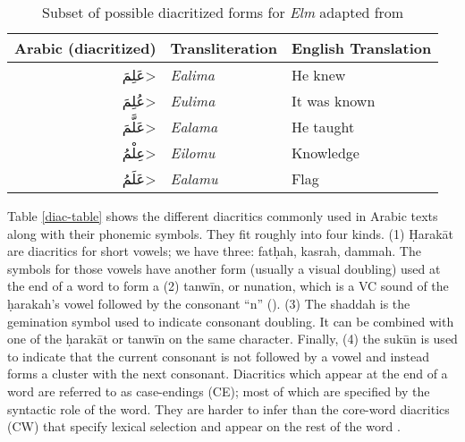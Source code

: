 \documentclass[11pt]{article}
\begin{document}
\begin{table}[ht]
\centering
\begin{tabular}{|r|l|l|}
\hline 
\bf Arabic (diacritized) & \bf Transliteration & \bf English Translation \\ \hline
\<عَلِمَ>   &   \textit{Ealima}          & He knew \\
\<عُلِمَ>   &   \textit{Eulima}          & It was known \\
\<عَلَّمَ>   &   \textit{Ealama}    & He taught \\
\<عِلْمُ>   &   \textit{Eilomu}          & Knowledge \\
\<عَلَمُ>   &   \textit{Ealamu}          & Flag \\
\hline
\end{tabular}
\caption{Subset of possible diacritized forms for \textit{Elm} adapted from \protect\cite{belinkov-glass-2015-arabic} }
\label{elm-table}
\end{table}

Table \ref{diac-table} shows the different diacritics commonly used in Arabic texts along with their phonemic symbols. They fit roughly into four kinds. (1) \d{H}arakāt are diacritics for short vowels; we have three: fat\d{h}ah, kasrah, dammah. The symbols for those vowels have another form (usually a visual doubling) used at the end of a word to form a (2) tanwīn, or nunation, which is a VC sound of the \d{h}arakah's vowel followed by the consonant ``n'' (). (3) The shaddah is the gemination symbol used to indicate consonant doubling. It can be combined with one of the \d{h}arakāt or tanwīn on the same character. Finally, (4) the sukūn is used to indicate that the current consonant is not followed by a vowel and instead forms a cluster with the next consonant. Diacritics which appear at the end of a word are referred to as case-endings (CE); most of which are specified by the syntactic role of the word. They are harder to infer than the core-word diacritics (CW) that specify lexical selection and appear on the rest of the word \cite{mubarak19-highly}.
\end{document}
